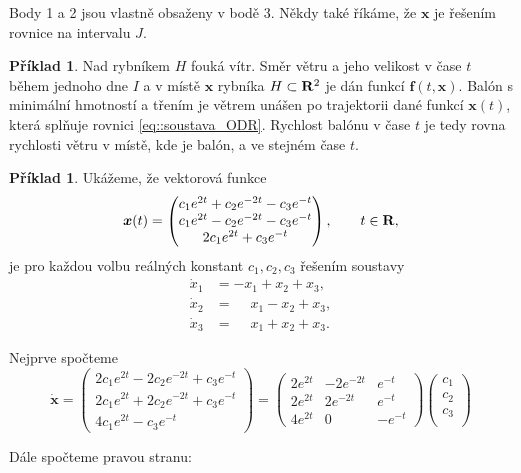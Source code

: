 \documentclass[a4paper, 12pt]{book}
\theoremstyle{definition}
\newtheorem{example}[theorem]{Příklad}
\def\Real{{\rm\bf R}}
\def\vc#1{\mathbf{\boldsymbol{#1}}}     %
\begin{document}
Body 1 a 2 jsou vlastně obsaženy v bodě 3.
Někdy také říkáme, že $\vc x$ je řešením rovnice na intervalu $J$.

\begin{example}
\label{balon}
Nad rybníkem $H$ fouká vítr. Směr větru a jeho velikost v čase $t$ během jednoho dne $I$ a v místě $\vc x$ rybníka  $H\subset \Real^2$
je dán funkcí $\vc f(t, \vc x)$. Balón s minimální hmotností a třením je větrem unášen po trajektorii dané funkcí $\vc x(t)$,
která splňuje rovnici \eqref{eq::soustava_ODR}. 
Rychlost balónu v čase $t$ je tedy rovna rychlosti větru v místě, kde je balón, a ve stejném čase $t$.
\end{example}


\begin{example}
Ukážeme, že vektorová funkce
\[
\vc x(t) = \begin{pmatrix}
c_1 e^{2t} + c_2 e^{-2t} - c_3 e^{-t}\\
c_1 e^{2t} - c_2 e^{-2t} - c_3 e^{-t}\\
2c_1 e^{2t} + c_3 e^{-t}
\end{pmatrix}, \qquad t\in \Real,
\]
je pro každou volbu reálných konstant $c_1, c_2, c_3$ řešením soustavy
\begin{align*}
\dot x_1 &= -x_1 + x_2 + x_3,\\
\dot x_2 &= \phantom{-}x_1 - x_2 + x_3,\\
\dot x_3 &= \phantom{-}x_1 + x_2 + x_3. 
\end{align*}

Nejprve spočteme 
\[
  \dot{\vc x}=
\begin{pmatrix}
2 c_1 e^{2t} - 2 c_2 e^{-2t} + c_3 e^{-t}\\
2c_1 e^{2t} +2 c_2 e^{-2t} + c_3 e^{-t}\\
4c_1 e^{2t}              - c_3 e^{-t}
\end{pmatrix}=
\begin{pmatrix}
2e^{2t} & -2 e^{-2t} & e^{-t}\\
2e^{2t} &  2 e^{-2t} & e^{-t}\\
4e^{2t} & 0          & -e^{-t}
\end{pmatrix}
\begin{pmatrix}
c_1\\
c_2\\
c_3\\
\end{pmatrix}
\]
\end{example}
Dále spočteme pravou stranu:
\end{document}
